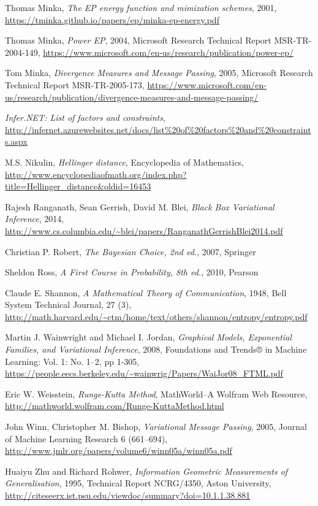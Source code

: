 \documentclass[12pt,vu]{adammath}
\theoremstyle{plain}
\theoremstyle{definition}
\theoremstyle{remark}
\begin{document}
\begin{thebibliography}{xx}
  Thomas Minka,
  \emph{The EP energy function and mimization schemes},
  2001,
  \url{https://tminka.github.io/papers/ep/minka-ep-energy.pdf}

  Thomas Minka,
  \emph{Power EP},
  2004,
  Microsoft Research Technical Report MSR-TR-2004-149,
  \url{https://www.microsoft.com/en-us/research/publication/power-ep/}

  Tom Minka,
  \emph{Divergence Measures and Message Passing},
  2005,
  Microsoft Research Technical Report MSR-TR-2005-173,
  \url{https://www.microsoft.com/en-us/research/publication/divergence-measures-and-message-passing/}


  \emph{Infer.NET: List of factors and constraints},
  \url{http://infernet.azurewebsites.net/docs/list\%20of\%20factors\%20and\%20constraints.aspx}

  M.S. Nikulin,
  \emph{Hellinger distance},
  Encyclopedia of Mathematics,
  \url{http://www.encyclopediaofmath.org/index.php?title=Hellinger_distance&oldid=16453}

  Rajesh Ranganath, Sean Gerrish, David M. Blei,
  \emph{Black Box Variational Inference},
  2014,
  \url{http://www.cs.columbia.edu/~blei/papers/RanganathGerrishBlei2014.pdf}

  Christian P. Robert,
  \emph{The Bayesian Choice, 2nd ed.},
  2007,
  Springer

  Sheldon Ross,
  \emph{A First Course in Probability, 8th ed.},
  2010,
  Pearson

  Claude E. Shannon,
  \emph{A Mathematical Theory of Communication},
  1948,
  Bell System Technical Journal, 27 (3),
  \url{http://math.harvard.edu/~ctm/home/text/others/shannon/entropy/entropy.pdf}

  Martin J. Wainwright and Michael I. Jordan,
  \emph{Graphical Models, Exponential Families, and Variational Inference},
  2008,
  Foundations and Trends® in Machine Learning: Vol. 1: No. 1–2, pp 1-305,
  \url{https://people.eecs.berkeley.edu/~wainwrig/Papers/WaiJor08_FTML.pdf}

  Eric W. Weisstein,
  \emph{Runge-Kutta Method},
  MathWorld--A Wolfram Web Resource,
  \url{http://mathworld.wolfram.com/Runge-KuttaMethod.html}

  John Winn, Christopher M. Bishop,
  \emph{Variational Message Passing},
  2005,
  Journal of Machine Learning Research 6 (661–694),
  \url{http://www.jmlr.org/papers/volume6/winn05a/winn05a.pdf}

  Huaiyu Zhu and Richard Rohwer,
  \emph{Information Geometric Measurements of Generalisation},
  1995,
  Technical Report NCRG/4350,
  Aston University,
  \url{http://citeseerx.ist.psu.edu/viewdoc/summary?doi=10.1.1.38.881}
\end{thebibliography}
%
%
\end{document}
